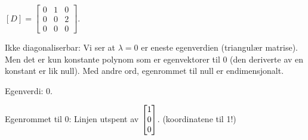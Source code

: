 \begin{losning}

\begin{punkt}
$[D]=\begin{bmatrix}
0 & 1 & 0\\
0 & 0 & 2\\
0 & 0 & 0
\end{bmatrix}$.
\end{punkt}

\begin{punkt}
Ikke diagonaliserbar: Vi ser at $\lambda=0$ er eneste egenverdien (triangulær matrise). Men det er kun konstante polynom som er egenvektorer til 0 (den deriverte av en konstant er lik null). Med andre ord, egenrommet til null er endimensjonalt.
\end{punkt}

\begin{punkt}
Egenverdi: 0.

\noindent
Egenrommet til 0: Linjen utspent av $\begin{bmatrix} 1 \\ 0 \\ 0 \end{bmatrix}$. (koordinatene til 1!)
\end{punkt}
\end{losning}

